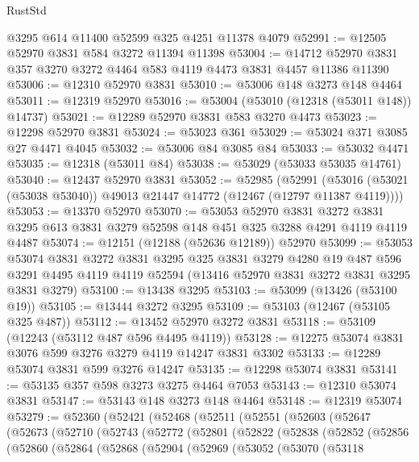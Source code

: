 \begin{lexlean}{RustStd}
\begin{coremodule}
    @3295
    @614
    @11400
    @52599
    @325
    @4251
    @11378
    @4079
@52991 := @12505 @52970 @3831 @584 @3272 @11394 @11398
@53004 := @14712 @52970 @3831 @357 @3270 @3272 @4464 @583 @4119 @4473 @3831 @4457 @11386 @11390
@53006 := @12310 @52970 @3831
@53010 := @53006 @148 @3273 @148 @4464
@53011 := @12319 @52970
@53016 := @53004 (@53010 (@12318 (@53011 @148)) @14737)
@53021 := @12289 @52970 @3831 @583 @3270 @4473
@53023 := @12298 @52970 @3831
@53024 := @53023 @361
@53029 := @53024 @371 @3085 @27 @4471 @4045
@53032 := @53006 @84 @3085 @84
@53033 := @53032 @4471
@53035 := @12318 (@53011 @84)
@53038 := @53029 (@53033 @53035 @14761)
@53040 := @12437 @52970 @3831
@53052 := @52985
    (@52991 (@53016 (@53021 (@53038 @53040)) @49013 @21447 @14772 (@12467 (@12797 @11387 @4119))))
@53053 := @13370 @52970
@53070 := @53053
    @52970
    @3831
    @3272
    @3831
    @3295
    @613
    @3831
    @3279
    @52598
    @148
    @451
    @325
    @3288
    @4291
    @4119
    @4119
    @4487
@53074 := @12151 (@12188 (@52636 @12189)) @52970
@53099 := @53053
    @53074
    @3831
    @3272
    @3831
    @3295
    @325
    @3831
    @3279
    @4280
    @19
    @487
    @596
    @3291
    @4495
    @4119
    @4119
    @52594
    (@13416 @52970 @3831 @3272 @3831 @3295 @3831 @3279)
@53100 := @13438 @3295
@53103 := @53099 (@13426 (@53100 @19))
@53105 := @13444 @3272 @3295
@53109 := @53103 (@12467 (@53105 @325 @487))
@53112 := @13452 @52970 @3272 @3831
@53118 := @53109 (@12243 (@53112 @487 @596 @4495 @4119))
@53128 := @12275 @53074 @3831 @3076 @599 @3276 @3279 @4119 @14247 @3831 @3302
@53133 := @12289 @53074 @3831 @599 @3276 @14247
@53135 := @12298 @53074 @3831
@53141 := @53135 @357 @598 @3273 @3275 @4464 @7053
@53143 := @12310 @53074 @3831
@53147 := @53143 @148 @3273 @148 @4464
@53148 := @12319 @53074
@53279 := @52360
    (@52421
      (@52468
        (@52511
          (@52551
            (@52603
              (@52647
                (@52673
                  (@52710
                    (@52743
                      (@52772
                        (@52801
                          (@52822
                            (@52838
                              (@52852
                                (@52856
                                  (@52860
                                    (@52864
                                      (@52868
                                        (@52904
                                          (@52969
                                            (@53052
                                              (@53070
                                                (@53118

\end{coremodule}
\end{lexlean}
